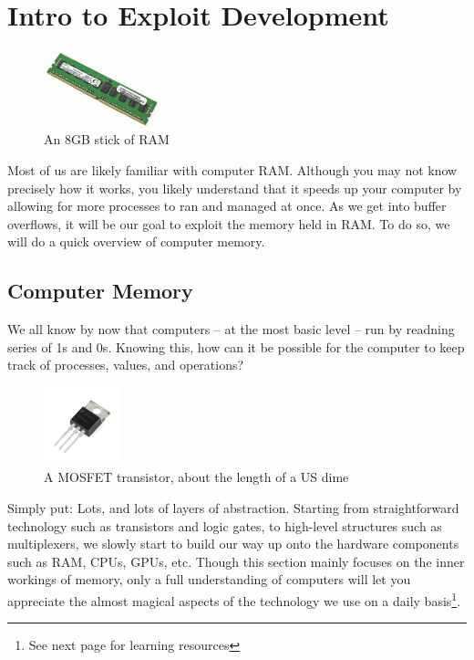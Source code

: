 \documentclass[a4paper,11pt]{article}
\begin{document}
\section{Intro to Exploit Development}

\begin{figure}[h]
    \centering
    \includegraphics[width=0.3\textwidth]{images/ramstick.jpg}
    \caption{An 8GB stick of RAM}
    \label{fig:ramstick}
\end{figure}

Most of us are likely familiar with computer RAM. Although you may not know precisely how it works, you likely understand that it speeds up your computer by allowing for more processes to ran and managed at once.
\newline
\newline
As we get into buffer overflows, it will be our goal to exploit the memory held in RAM. To do so, we will do a quick overview of computer memory.

\subsection{Computer Memory}

We all know by now that computers -- at the most basic level -- run by readning series of 1s and 0s. Knowing this, how can it be possible for the computer to keep track of processes, values, and operations?
\begin{figure}[h]
    \centering
    \includegraphics[width=0.2\textwidth]{images/transistor.jpg}
    \caption{A MOSFET transistor, about the length of a US dime}
\end{figure}
\newline
\newline
Simply put: Lots, and lots of layers of abstraction. Starting from straightforward technology such as transistors and logic gates, to high-level structures such as multiplexers, we slowly start to build our way up onto the hardware components such as RAM, CPUs, GPUs, etc.
\newline
\newline
Though this section mainly focuses on the inner workings of memory, only a full understanding of computers will let you appreciate the almost magical aspects of the technology we use on a daily basis\footnote[2]{See next page for learning resources}.
\end{document}
